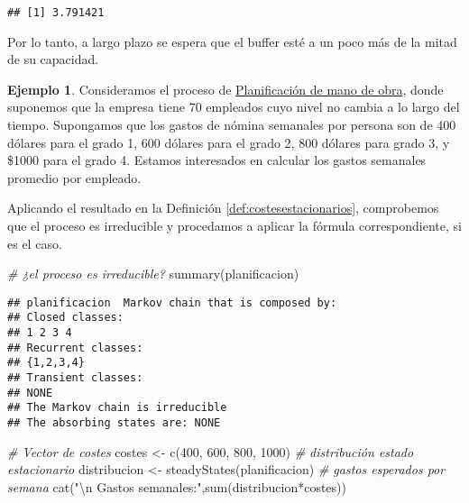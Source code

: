 \documentclass[
]{book}
\newenvironment{Shaded}{\begin{snugshade}}{\end{snugshade}}
\newcommand{\CommentTok}[1]{\textcolor[rgb]{0.56,0.35,0.01}{\textit{#1}}}
\newcommand{\DecValTok}[1]{\textcolor[rgb]{0.00,0.00,0.81}{#1}}
\newcommand{\FunctionTok}[1]{\textcolor[rgb]{0.00,0.00,0.00}{#1}}
\newcommand{\NormalTok}[1]{#1}
\newcommand{\OtherTok}[1]{\textcolor[rgb]{0.56,0.35,0.01}{#1}}
\newcommand{\SpecialCharTok}[1]{\textcolor[rgb]{0.00,0.00,0.00}{#1}}
\newcommand{\StringTok}[1]{\textcolor[rgb]{0.31,0.60,0.02}{#1}}
\theoremstyle{definition}
\theoremstyle{definition}
\newtheorem{example}{Ejemplo}[chapter]
\theoremstyle{definition}
\theoremstyle{definition}
\theoremstyle{remark}
\begin{document}
\begin{verbatim}
## [1] 3.791421
\end{verbatim}

Por lo tanto, a largo plazo se espera que el buffer esté a un poco más de la mitad de su capacidad.

\begin{example}
Consideramos el proceso de \protect\hyperlink{planificacion}{Planificación de mano de obra}, donde suponemos que la empresa tiene 70 empleados cuyo nivel no cambia a lo largo del tiempo. Supongamos que los gastos de nómina semanales por persona son de 400 dólares para el grado 1, 600 dólares para el grado 2, 800 dólares para grado 3, y \$1000 para el grado 4. Estamos interesados en calcular los gastos semanales promedio por empleado.
\end{example}

Aplicando el resultado en la Definición \ref{def:costesestacionarios}, comprobemos que el proceso es irreducible y procedamos a aplicar la fórmula correspondiente, si es el caso.

\begin{Shaded}
\begin{Highlighting}[]
\CommentTok{\# ¿el proceso es irreducible?}
\FunctionTok{summary}\NormalTok{(planificacion)}
\end{Highlighting}
\end{Shaded}

\begin{verbatim}
## planificacion  Markov chain that is composed by: 
## Closed classes: 
## 1 2 3 4 
## Recurrent classes: 
## {1,2,3,4}
## Transient classes: 
## NONE 
## The Markov chain is irreducible 
## The absorbing states are: NONE
\end{verbatim}

\begin{Shaded}
\begin{Highlighting}[]
\CommentTok{\# Vector de costes}
\NormalTok{costes }\OtherTok{\textless{}{-}} \FunctionTok{c}\NormalTok{(}\DecValTok{400}\NormalTok{, }\DecValTok{600}\NormalTok{, }\DecValTok{800}\NormalTok{, }\DecValTok{1000}\NormalTok{)}
\CommentTok{\# distribución estado estacionario}
\NormalTok{distribucion }\OtherTok{\textless{}{-}} \FunctionTok{steadyStates}\NormalTok{(planificacion)}
\CommentTok{\# gastos esperados por semana}
\FunctionTok{cat}\NormalTok{(}\StringTok{"}\SpecialCharTok{\textbackslash{}n}\StringTok{ Gastos semanales:"}\NormalTok{,}\FunctionTok{sum}\NormalTok{(distribucion}\SpecialCharTok{*}\NormalTok{costes))}
\end{Highlighting}
\end{Shaded}
\end{document}
